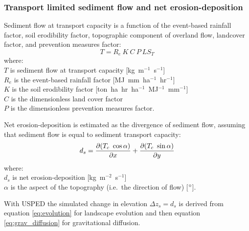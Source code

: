 \documentclass[gmd, manuscript]{copernicus}
\begin{document}
\subsubsection{Transport limited sediment flow and net erosion-deposition}
\noindent
Sediment flow at transport capacity is a function of 
the event-based rainfall factor, soil erodibility factor, 
topographic component of overland flow,
landcover factor, and prevention measures factor:
%
\begin{equation}
\label{eq:usped}
{T = R_e ~ K ~ C ~ P ~ LS_T}
\end{equation}
{\small
\noindent
where: \\
\noindent
\hspace*{0.5em} $T$ is sediment flow at transport capacity [\unit{kg~m}$^{-1}$~\unit{s}$^{-1}$]\\ 
\hspace*{0.5em} $R_e$ is the event-based rainfall factor [\unit{MJ~mm~ha}$^{-1}$~\unit{hr}$^{-1}$]\\
\hspace*{0.5em} $K$ is the soil erodibility factor [\unit{ton~ha~hr~ha}$^{-1}$~\unit{MJ}$^{-1}$~\unit{mm}$^{-1}$]\\ 
\hspace*{0.5em} $C$ is the dimensionless land cover factor\\
\hspace*{0.5em} $P$ is the dimensionless prevention measures factor.\\
}

\noindent
Net erosion-deposition is estimated as the divergence of sediment flow, 
assuming that sediment flow is equal to sediment transport capacity: 
\begin{equation}\label{eq:usped_erdep} 
d_s = 
{\partial (T_c ~ \cos \alpha) \over \partial x} +
{\partial (T_c ~ \sin \alpha) \over \partial y}
\end{equation}
{\small
\noindent
where: \\
\hspace*{0.5em} $d_s$ is net erosion-deposition [\unit{kg~m}$^{-2}$~\unit{s}$^{-1}$]\\
\hspace*{0.5em} $\alpha$ is the aspect of the topography (i.e.~the direction of flow) [$^{\circ}$].\\
}

\noindent
With USPED the simulated change in elevation $\Delta z_s=d_s$
is derived from equation \ref{eq:evolution} for landscape evolution
and then equation \ref{eq:grav_diffusion}
for gravitational diffusion.
\end{document}
